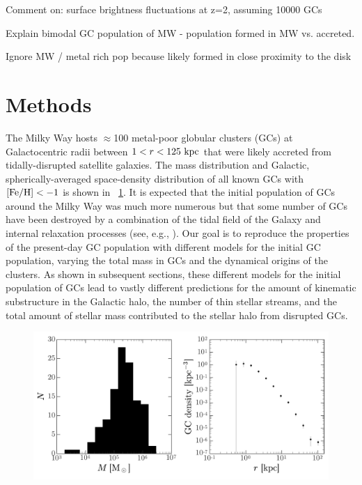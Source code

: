 \documentclass[manuscript, letterpaper]{aastex6}
\begin{document}
Comment on: surface brightness fluctuations at z=2, assuming 10000 GCs

Explain bimodal GC population of MW - population formed in MW vs. accreted.

Ignore MW / metal rich pop because likely formed in close proximity to the disk

\section{Methods}\label{sec:methods}

The Milky Way hosts $\approx$100 metal-poor globular clusters (GCs) at
Galactocentric radii between $1 < r < 125~\mathrm{kpc}$ that were likely accreted from
tidally-disrupted satellite galaxies.
The mass distribution and Galactic, spherically-averaged space-density
distribution of all known GCs with ${\rm [Fe/H]} < -1$ is shown in
\figname~\ref{fig:mw-gc-pop}.
It is expected that the initial population of GCs around the Milky Way was much
more numerous but that some number of GCs have been destroyed by a combination
of the tidal field of the Galaxy and internal relaxation processes (see, e.g.,
\citealt{Gnedin:1997}).
Our goal is to reproduce the properties of the present-day GC population with
different models for the initial GC population, varying the total mass in GCs
and the dynamical origins of the clusters.
As shown in subsequent sections, these different models for the initial
population of GCs lead to vastly different predictions for the amount of
kinematic substructure in the Galactic halo, the number of thin stellar streams,
and the total amount of stellar mass contributed to the stellar halo from
disrupted GCs.

\begin{figure}[h]
\begin{center}
\includegraphics[width=\textwidth]{figures/mass-gcdensity.pdf}
\end{center}
\caption{%
\label{fig:mw-gc-pop}}
\end{figure}
\end{document}
